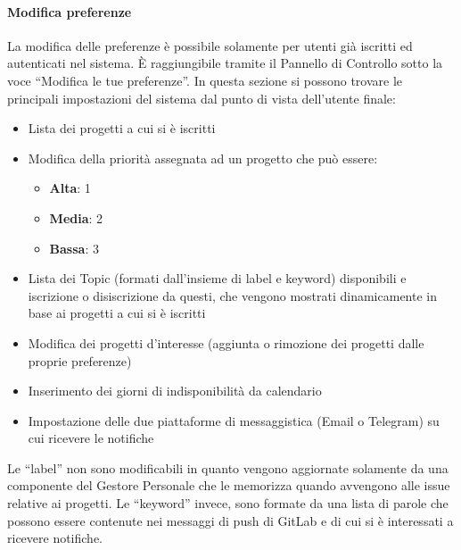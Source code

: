 \paragraph{Modifica preferenze}\label{preferenze}
La modifica delle preferenze è possibile solamente per utenti già iscritti ed autenticati nel sistema.
È raggiungibile tramite il Pannello di Controllo sotto la voce ``Modifica le tue preferenze''.
In questa sezione si possono trovare le principali impostazioni del sistema dal punto di vista dell'utente finale:
\begin{itemize}
	\item Lista dei progetti a cui si è iscritti
	\item Modifica della priorità assegnata ad un progetto che può essere:
	\begin{itemize}
        \item \textbf{Alta}: 1
        \item \textbf{Media}: 2
        \item \textbf{Bassa}: 3
    \end{itemize}
	\item Lista dei Topic (formati dall'insieme di label e keyword) disponibili e iscrizione o disiscrizione da questi, che vengono mostrati dinamicamente in base ai progetti a cui si è iscritti
	\item Modifica dei progetti d'interesse (aggiunta o rimozione dei progetti dalle proprie preferenze)
	\item Inserimento dei giorni di indisponibilità da calendario
	\item Impostazione delle due piattaforme di messaggistica (Email o Telegram) su cui ricevere le notifiche
\end{itemize}
Le ``label'' non sono modificabili in quanto vengono aggiornate solamente da una componente del Gestore Personale che le memorizza quando avvengono  alle issue relative ai progetti.
Le ``keyword'' invece, sono formate da una lista di parole che possono essere contenute nei messaggi di push di GitLab e di cui si è interessati a ricevere notifiche.
